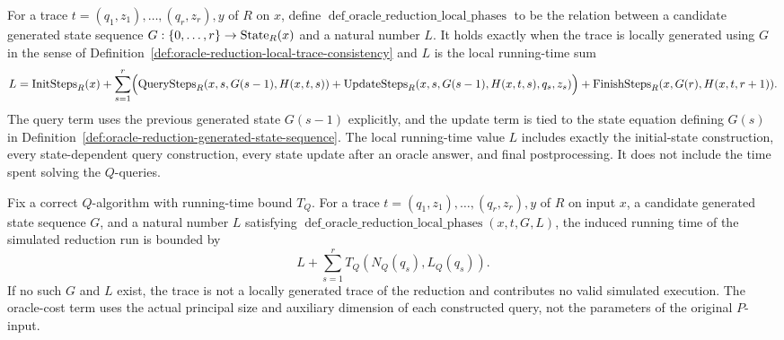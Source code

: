 \begin{definition}
  \label{def:oracle-reduction-local-phases}
  For a trace
  $t=(q_1,z_1),\ldots,(q_r,z_r),y$ of $R$ on $x$, define
  $\operatorname{def\_oracle\_reduction\_local\_phases}$ to be the relation
  between a candidate generated state sequence
  $G:\{0,\ldots,r\}\to\operatorname{State}_R(x)$ and a natural number $L$.  It holds exactly
  when the trace is locally generated using $G$ in the sense of
  Definition~\ref{def:oracle-reduction-local-trace-consistency} and $L$ is the
  local running-time sum
  \[
    L
    =
    \operatorname{InitSteps}_R(x)
    +\sum_{s=1}^{r}
      \Bigl(
        \operatorname{QuerySteps}_R(x,s,G(s-1),H(x,t,s))
        +
        \operatorname{UpdateSteps}_R(x,s,G(s-1),H(x,t,s),q_s,z_s)
      \Bigr)
    +\operatorname{FinishSteps}_R(x,G(r),H(x,t,r+1)).
  \]
  The query term uses the previous generated state $G(s-1)$ explicitly, and
  the update term is tied to the state equation defining $G(s)$ in
  Definition~\ref{def:oracle-reduction-generated-state-sequence}.  The local
  running-time value $L$
  includes exactly the initial-state construction, every state-dependent query
  construction, every state update after an oracle answer, and final
  postprocessing.  It does not include the time spent solving the $Q$-queries.
\end{definition}

\begin{definition}
  \label{def:oracle-reduction-cost}
  Fix a correct $Q$-algorithm with running-time bound $T_Q$.  For a trace
  $t=(q_1,z_1),\ldots,(q_r,z_r),y$ of $R$ on input $x$, a candidate generated
  state sequence $G$, and a natural number $L$ satisfying
  $\operatorname{def\_oracle\_reduction\_local\_phases}(x,t,G,L)$, the induced
  running time of the simulated reduction run is bounded by
  \[
    L
    +\sum_{s=1}^{r} T_Q(N_Q(q_s),L_Q(q_s)).
  \]
  If no such $G$ and $L$ exist, the trace is not a locally generated trace of
  the reduction and contributes no valid simulated execution.
  The oracle-cost term uses the actual principal size and auxiliary dimension
  of each constructed query, not the parameters of the original $P$-input.
\end{definition}

